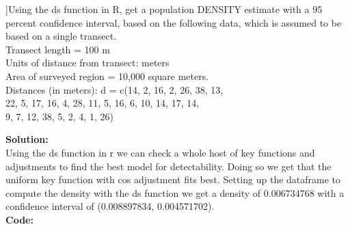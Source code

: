 \documentclass[12pt]{article}
\makeatletter
\theoremstyle{homework}
\newenvironment{exercise}[1]
{\def\@currentlabel{#1}\exercisecore}
{\endexercisecore}
\newcommand{\localhead}[1]{\par\smallskip\noindent\textbf{#1}\nobreak\\}%
\newcommand\solution{\localhead{Solution:}}
\makeatother
\begin{document}
\begin{exercise}[7]Using the ds function in R, get a population DENSITY estimate with a 95 percent confidence interval, based on the following data, 
  which is assumed to be based on a single transect.\\
  Transect length = 100 m\\
  Units of distance from transect: meters\\
  Area of surveyed region = 10,000 square meters.\\
  Distances (in meters): d = c(14, 2, 16, 2, 26, 38, 13,\\
   22, 5, 17, 16, 4, 28, 11, 5, 16, 6, 10, 14, 17, 14,\\
    9, 7, 12, 38, 5, 2, 4, 1, 26)

  \solution Using the ds function in r we can check a whole host of key functions and adjustments to find the best model for detectability. Doing so we get that 
  the uniform key function with cos adjustment fits best. Setting up the dataframe to compute the density with the ds function we get a density of 0.006734768 with a confidence interval of 
  (0.008897834, 0.004571702).\\
  \textbf{Code:}
  \begin{center}
     
  \end{center}




  
\end{exercise}
\end{document}
